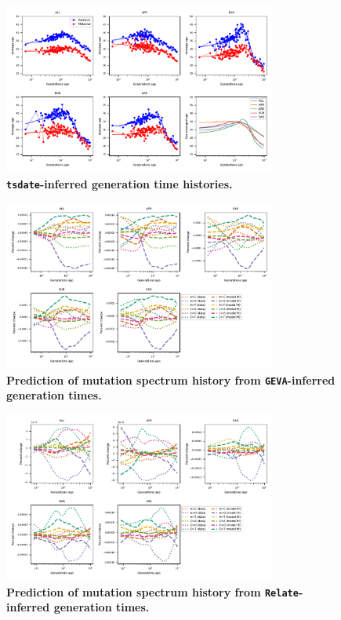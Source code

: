 \documentclass[]{article}
\begin{document}
\begin{figure}[ht!]
    \centering
    \includegraphics[width=0.8\textwidth]{../plots/inferred_generation_times.tsdate.pdf}
    \caption{
        \textbf{\texttt{tsdate}-inferred generation time histories.}
    }
    \label{fig:tsdate-gen-times}
\end{figure}


\begin{figure}[ht!]
    \centering
    \includegraphics[width=0.8\textwidth]{../plots/goodness-of-fit.geva.pdf}
    \caption{
        \textbf{Prediction of mutation spectrum history from
        \texttt{GEVA}-inferred generation times.}
    }
    \label{fig:geva-fit}
\end{figure}


\begin{figure}[ht!]
    \centering
    \includegraphics[width=0.8\textwidth]{../plots/goodness-of-fit.relate.pdf}
    \caption{
        \textbf{Prediction of mutation spectrum history from
        \texttt{Relate}-inferred generation times.}
    }
    \label{fig:relate-fit}
\end{figure}
\end{document}
